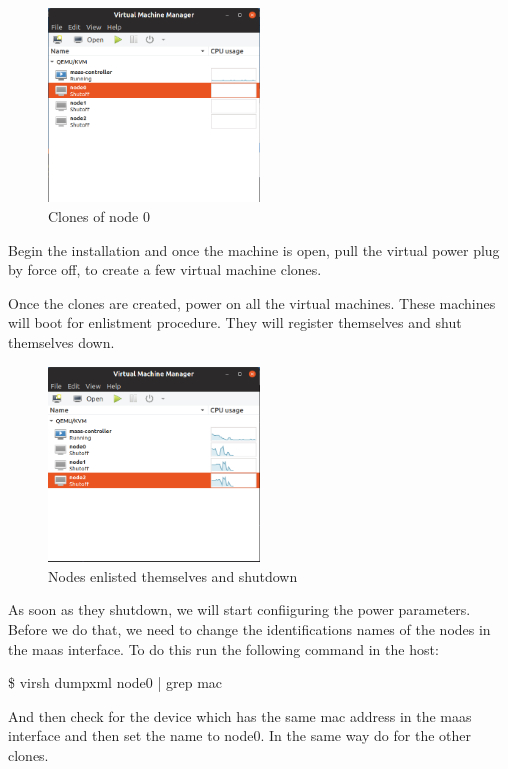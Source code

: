 \begin{figure}[!ht]
    \centering
    \includegraphics[width=0.5\textwidth]{images/5-2.png}
    \caption{Clones of node 0}
\end{figure}


Begin the installation and once the machine is open, pull the virtual power plug by force off, to create a few virtual machine clones.

Once the clones are created, power on all the virtual machines. These machines will boot for enlistment procedure. They will register themselves and shut themselves down.

\begin{figure}[!ht]
    \centering
    \includegraphics[width=0.5\textwidth]{images/5-3.png}
    \caption{Nodes enlisted themselves and shutdown}
\end{figure}

As soon as they shutdown, we will start confiiguring the power parameters. Before we do that, we need to change the identifications names of the nodes in the maas interface. To do this run the following command in the host:

\$ virsh dumpxml node0 | grep mac 

And then check for the device which has the same mac address in the maas interface and then set the name to node0. In the same way do for the other clones.


